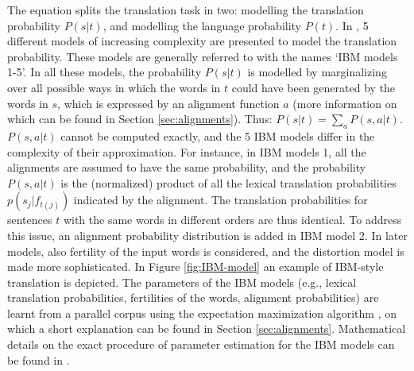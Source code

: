 \documentclass{report}
\theoremstyle{definition}
\theoremstyle{plain}
\begin{document}
The equation splits the translation task in two: modelling the translation probability $P(s|t)$, and modelling the language probability $P(t)$. In \cite{brown1993mathematics}, 5 different models of increasing complexity are presented to model the translation probability. These models are generally referred to with the names `IBM models 1-5'. In all these models, the probability $P(s|t)$ is modelled by marginalizing over all possible ways in which the words in $t$ could have been generated by the words in $s$, which is expressed by an alignment function $a$ (more information on which can be found in Section \ref{sec:alignments}). Thus: $P(s|t) = \sum_a P(s,a|t)$. $P(s,a|t)$ cannot be computed exactly, and the 5 IBM models differ in the complexity of their approximation. For instance, in IBM models 1, all the alignments are assumed to have the same probability, and the probability $P(s,a|t)$ is the (normalized) product of all the lexical translation probabilities $p(s_j|f_{t(j)})$ indicated by the alignment. The translation probabilities for sentences $t$ with the same words in different orders are thus identical. To address this issue, an alignment probability distribution is added in IBM model 2. In later models, also fertility of the input words is considered, and the distortion model is made more sophisticated. In Figure \ref{fig:IBM-model} an example of IBM-style translation is depicted. The parameters of the IBM models (e.g., lexical translation probabilities, fertilities of the words, alignment probabilities) are learnt from a parallel corpus using the expectation maximization algorithm \citep{dempster1977maximum}, on which a short explanation can be found in Section \ref{sec:alignments}. Mathematical details on the exact procedure of parameter estimation for the IBM models can be found in \cite{brown1993mathematics}.
\end{document}
